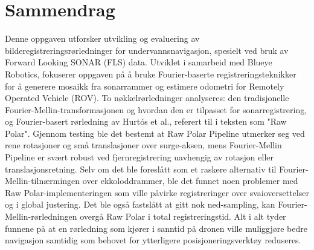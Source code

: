 \chapter*{Sammendrag}

Denne oppgaven utforsker utvikling og evaluering av bilderegistreringsrørledninger for undervannsnavigasjon, spesielt ved bruk av Forward Looking SONAR (FLS) data. Utviklet i samarbeid med Blueye Robotics, fokuserer oppgaven på å bruke Fourier-baserte registreringsteknikker for å generere mosaikk fra sonarrammer og estimere odometri for Remotely Operated Vehicle (ROV). To nøkkelrørledninger analyseres: den tradisjonelle Fourier-Mellin-transformasjonen og hvordan den er tilpasset for sonarregistrering, og Fourier-basert rørledning av Hurtós et al., referert til i teksten som "Raw Polar". Gjennom testing ble det bestemt at Raw Polar Pipeline utmerker seg ved rene rotasjoner og små translasjoner over surge-aksen, mens Fourier-Mellin Pipeline er svært robust ved fjernregistrering uavhengig av rotasjon eller translasjonsretning. Selv om det ble foreslått som et raskere alternativ til Fourier-Mellin-tilnærmingen over ekkoloddrammer, ble det funnet noen problemer med Raw Polar-implementeringen som ville påvirke registreringer over svaioversettelser og i global justering. Det ble også fastslått at gitt nok ned-sampling, kan Fourier-Mellin-rørledningen overgå Raw Polar i total registreringstid. Alt i alt tyder funnene på at en rørledning som kjører i sanntid på dronen ville muliggjøre bedre navigasjon samtidig som behovet for ytterligere posisjoneringsverktøy reduseres.